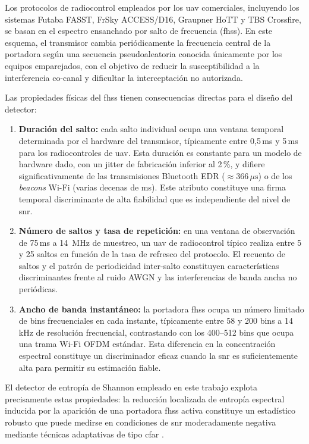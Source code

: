 Los protocolos de radiocontrol empleados por los \gls{uav} comerciales, incluyendo los
sistemas Futaba FASST, FrSky ACCESS/D16, Graupner HoTT y TBS Crossfire, se basan
en el espectro ensanchado por salto de frecuencia (\gls{fhss}). En este esquema, el
transmisor cambia periódicamente la frecuencia central de la portadora según una
secuencia pseudoaleatoria conocida únicamente por los equipos emparejados, con
el objetivo de reducir la susceptibilidad a la interferencia co-canal y dificultar
la interceptación no autorizada.

Las propiedades físicas del \gls{fhss} tienen consecuencias directas para el diseño
del detector:

\begin{enumerate}
 \item \textbf{Duración del salto:} cada salto individual ocupa una ventana temporal
 determinada por el hardware del transmisor, típicamente entre 0,5\,ms y 5\,ms
 para los radiocontroles de \gls{uav}. Esta duración es constante para un modelo de
 hardware dado, con un jitter de fabricación inferior al 2\,\%, y difiere
 significativamente de las transmisiones Bluetooth EDR ($\approx 366\,\mu\text{s}$)
 o de los \textit{beacons} Wi-Fi (varias decenas de ms). Este atributo constituye
 una firma temporal discriminante de alta fiabilidad que es independiente del nivel
 de \gls{snr}.

 \item \textbf{Número de saltos y tasa de repetición:} en una ventana de observación
 de 75\,ms a 14\, MHz de muestreo, un \gls{uav} de radiocontrol típico realiza entre
 5 y 25 saltos en función de la tasa de refresco del protocolo. El recuento de
 saltos y el patrón de periodicidad inter-salto constituyen características
 discriminantes frente al ruido AWGN y las interferencias de banda ancha no
 periódicas.

 \item \textbf{Ancho de banda instantáneo:} la portadora \gls{fhss} ocupa un número
 limitado de bins frecuenciales en cada instante, típicamente entre 58 y 200 bins
 a 14\, kHz de resolución frecuencial, contrastando con los 400--512 bins que ocupa
 una trama Wi-Fi OFDM estándar. Esta diferencia en la concentración espectral
 constituye un discriminador eficaz cuando la \gls{snr} es suficientemente alta para
 permitir su estimación fiable.
\end{enumerate}

El detector de entropía de Shannon empleado en este trabajo explota precisamente
estas propiedades: la reducción localizada de entropía espectral inducida por la
aparición de una portadora \gls{fhss} activa constituye un estadístico robusto que
puede medirse en condiciones de \gls{snr} moderadamente negativa mediante técnicas
adaptativas de tipo \gls{cfar} \cite{lacy_machine_2024}.

